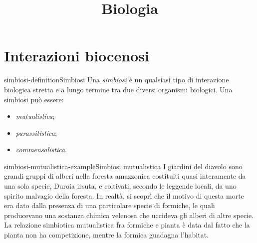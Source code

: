 \documentclass[preview]{standalone}
\begin{document}
\title{Biologia}
\genpage

\section{Interazioni biocenosi}

\begin{snippetdefinition}{simbiosi-definition}{Simbiosi}
    Una \textit{simbiosi} è un qualsiasi tipo di interazione biologica stretta
    e a lungo termine tra due diversi organismi biologici.
    Una simbiosi può essere:
    \begin{itemize}
        \item \textit{mutualistica};
        \item \textit{parassitistica};
        \item \textit{commensalistica}.
    \end{itemize}
\end{snippetdefinition}

\begin{snippetexample}{simbiosi-mutualistica-example}{Simbiosi mutualistica}
    I giardini del diavolo sono grandi gruppi di alberi nella foresta amazzonica
    costituiti quasi interamente da una sola specie, Duroia
    irsuta, e coltivati, secondo le leggende locali, da uno spirito
    malvagio della foresta.
    In realtà, si scoprì che il motivo di questa morte era dato dalla presenza
    di una particolare specie di formiche, le quali producevano una sostanza
    chimica velenosa che uccideva gli alberi di altre specie.
    La relazione simbiotica mutualistica fra formiche e pianta è data dal fatto che
    la pianta non ha competizione, mentre la formica guadagna l'habitat.  
\end{snippetexample}
\end{document}
